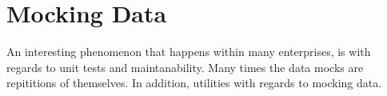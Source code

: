 \maketitle{}
\section{ Mocking Data }
An interesting phenomenon that happens within many enterprises, is with regards
to unit tests and maintanability. Many times the data mocks are repititions of
themselves. In addition, utilities with regards to mocking data.
